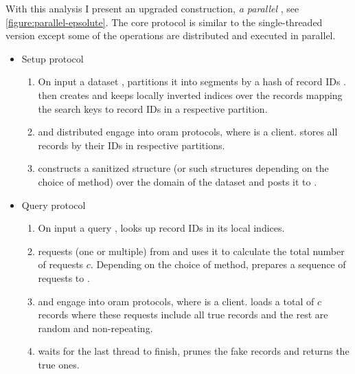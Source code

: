			With this analysis I present an upgraded construction, \emph{a parallel \epsolute{}}, see \cref{figure:parallel-epsolute}.
			The core protocol is similar to the single-threaded version except some of the operations are distributed and executed in parallel.
			\begin{itemize}
				\item
					Setup protocol \protocolSetup{}
					\begin{enumerate}
						\item
							On input a dataset \database{}, \user{} partitions it into \oramsNumber{} segments  by a hash of record IDs \recordID{}.
							\user{} then creates and keeps locally \oramsNumber{} inverted indices over the records mapping the search keys \searchKey{} to record IDs \recordID{} in a respective partition.
						\item
							\user{} and distributed \server{} engage into \oramsNumber{} \acrshort{oram} protocols, where \user{} is a client.
							\user{} stores all records by their IDs in respective \server{} partitions.
						\item
							\user{} constructs a sanitized structure \serverDS{} (or \oramsNumber{} such structures depending on the choice of method) over the domain of the dataset and posts it to \server{}.
					\end{enumerate}
				\item
					Query protocol \protocolQuery{}
					\begin{enumerate}
						\item
							On input a query \query{}, \user{} looks up record IDs in its local indices.
						\item
							\user{} requests (one or multiple) \serverDS{} from \server{} and uses it to calculate the total number of requests $c$.
							Depending on the choice of method, \user{} prepares a sequence of requests to \server{}.
						\item
							\user{} and \server{} engage into \oramsNumber{} \acrshort{oram} protocols, where \user{} is a client.
							\user{} loads a total of $c$ records where these requests include all true records and the rest are random and non-repeating.
						\item
							\user{} waits for the last thread to finish, prunes the fake records and returns the true ones.
					\end{enumerate}
			\end{itemize}

